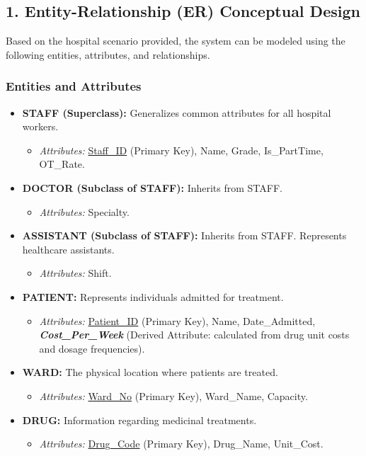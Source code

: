\documentclass[12pt,a3paper]{article}
\begin{document}
\begin{enumerate}
\begin{tcolorbox}[enhanced,breakable,ansbox,colback=cA!4,colframe=cA,boxrule=0.8pt,arc=5pt,title={\textbf{Answer}},fonttitle=\bfseries\color{white},colbacktitle=cA]

\subsection*{1. Entity-Relationship (ER) Conceptual Design}

Based on the hospital scenario provided, the system can be modeled using the following entities, attributes, and relationships.

\subsubsection*{Entities and Attributes}
\begin{itemize}[leftmargin=2em, itemsep=0.3em]
    \item \textbf{STAFF (Superclass):} Generalizes common attributes for all hospital workers. 
    \begin{itemize}
        \item \textit{Attributes:} \underline{Staff\_ID} (Primary Key), Name, Grade, Is\_PartTime, OT\_Rate.
    \end{itemize}
    \item \textbf{DOCTOR (Subclass of STAFF):} Inherits from STAFF.
    \begin{itemize}
        \item \textit{Attributes:} Specialty.
    \end{itemize}
    \item \textbf{ASSISTANT (Subclass of STAFF):} Inherits from STAFF. Represents healthcare assistants.
    \begin{itemize}
        \item \textit{Attributes:} Shift.
    \end{itemize}
    \item \textbf{PATIENT:} Represents individuals admitted for treatment.
    \begin{itemize}
        \item \textit{Attributes:} \underline{Patient\_ID} (Primary Key), Name, Date\_Admitted, \textbf{\textit{Cost\_Per\_Week}} (Derived Attribute: calculated from drug unit costs and dosage frequencies).
    \end{itemize}
    \item \textbf{WARD:} The physical location where patients are treated.
    \begin{itemize}
        \item \textit{Attributes:} \underline{Ward\_No} (Primary Key), Ward\_Name, Capacity.
    \end{itemize}
    \item \textbf{DRUG:} Information regarding medicinal treatments.
    \begin{itemize}
        \item \textit{Attributes:} \underline{Drug\_Code} (Primary Key), Drug\_Name, Unit\_Cost.
    \end{itemize}
\end{itemize}


\end{tcolorbox}
\end{enumerate}
\end{document}
